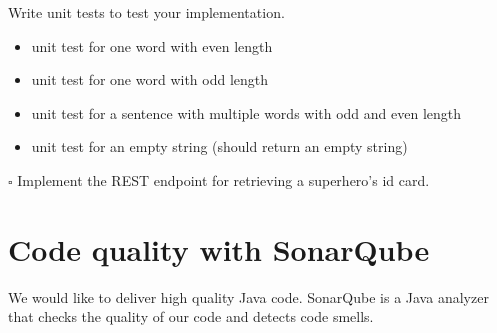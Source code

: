 \begin{oefening}
Write unit tests to test your implementation. 
\begin{itemize}
\item unit test for one word with even length
\item unit test for one word with odd length
\item unit test for a sentence with multiple words with odd and even length
\item unit test for an empty string (should return an empty string)
\end{itemize}

\vspace{5mm}

$\square$ Implement the REST endpoint for retrieving a superhero's id card.  
\end{oefening}

\section{Code quality with SonarQube}

We would like to deliver high quality Java code. SonarQube is a Java analyzer that checks the quality of our code and detects code smells.

